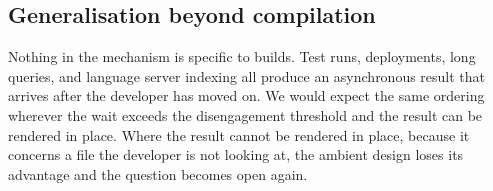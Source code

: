\subsection{Generalisation beyond compilation}

Nothing in the mechanism is specific to builds. Test runs, deployments, long
queries, and language server indexing all produce an asynchronous result that
arrives after the developer has moved on. We would expect the same ordering
wherever the wait exceeds the disengagement threshold and the result can be
rendered in place. Where the result cannot be rendered in place, because it
concerns a file the developer is not looking at, the ambient design loses its
advantage and the question becomes open again.
